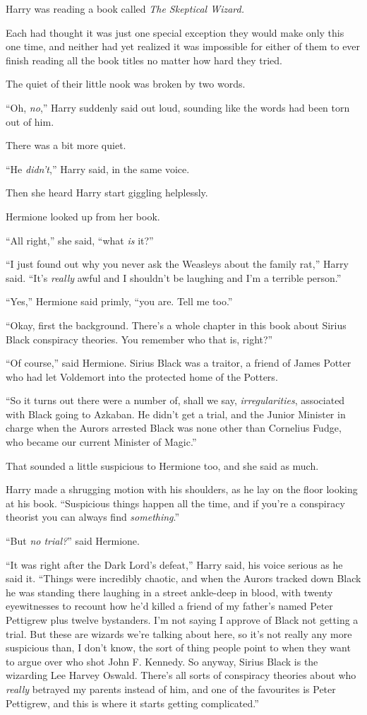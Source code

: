 Harry was reading a book called \emph{The Skeptical Wizard.}

Each had thought it was just one special exception they would make only this one time, and neither had yet realized it was impossible for either of them to ever finish reading all the book titles no matter how hard they tried.

The quiet of their little nook was broken by two words.

“Oh, \emph{no},” Harry suddenly said out loud, sounding like the words had been torn out of him.

There was a bit more quiet.

“He \emph{didn’t},” Harry said, in the same voice.

Then she heard Harry start giggling helplessly.

Hermione looked up from her book.

“All right,” she said, “what \emph{is} it?”

“I just found out why you never ask the Weasleys about the family rat,” Harry said.
“It’s \emph{really} awful and I shouldn’t be laughing and I’m a terrible person.”

“Yes,” Hermione said primly, “you are. Tell me too.”

“Okay, first the background. There’s a whole chapter in this book about Sirius Black conspiracy theories. You remember who that is, right?”

“Of course,” said Hermione. Sirius Black was a traitor, a friend of James Potter who had let Voldemort into the protected home of the Potters.

“So it turns out there were a number of, shall we say, \emph{irregularities}, associated with Black going to Azkaban. He didn’t get a trial, and the Junior Minister in charge when the Aurors arrested Black was none other than Cornelius Fudge, who became our current Minister of Magic.”

That sounded a little suspicious to Hermione too, and she said as much.

Harry made a shrugging motion with his shoulders, as he lay on the floor looking at his book.
“Suspicious things happen all the time, and if you’re a conspiracy theorist you can always find \emph{something}.”

“But \emph{no trial?}” said Hermione.

“It was right after the Dark Lord’s defeat,” Harry said, his voice serious as he said it.
“Things were incredibly chaotic, and when the Aurors tracked down Black he was standing there laughing in a street ankle-deep in blood, with twenty eyewitnesses to recount how he’d killed a friend of my father’s named Peter Pettigrew plus twelve bystanders. I’m not saying I approve of Black not getting a trial. But these are wizards we’re talking about here, so it’s not really any more suspicious than, I don’t know, the sort of thing people point to when they want to argue over who shot John F. Kennedy. So anyway, Sirius Black is the wizarding Lee Harvey Oswald. There’s all sorts of conspiracy theories about who \emph{really} betrayed my parents instead of him, and one of the favourites is Peter Pettigrew, and this is where it starts getting complicated.”

